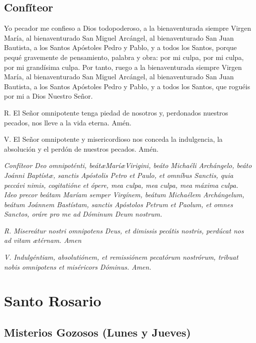 \documentclass[a4paper,11pt, oneside]{report}
\begin{document}
    \section{Confíteor}

      Yo pecador me confieso a Dios todopoderoso, a la bienaventurada siempre Virgen María, al bienaventurado San Miguel Arcángel,
      al bienaventurado San Juan Bautista, a los Santos Apóstoles Pedro y Pablo, y a todos los Santos, porque pequé gravemente de 
      pensamiento, palabra y obra: por mi culpa, por mi culpa, por mi grandísima culpa. Por tanto, ruego a la bienaventurada siempre
      Virgen María, al bienaventurado San Miguel Arcángel, al bienaventurado San Juan Bautista, a los Santos Apóstoles Pedro y Pablo,
      y a todos los Santos, que roguéis por mi a Dios Nuestro Señor.\par\smallskip
      R. El Señor omnipotente tenga piedad de nosotros y, perdonados nuestros pecados, nos lleve a la vida eterna. Amén.\par\smallskip
      V. El Señor omnipotente y misericordioso nos conceda la indulgencia, la absolución y el perdón de nuestros pecados. Amén.

      \medskip

      \textit{Confíteor Deo omnipoténti, beát\ae Marí\ae Virigini, beáto Michaéli Archángelo, beáto Joánni Baptíst\ae, sanctis Apóstolis
      Petro et Paulo, et omníbus Sanctis, quia peccávi nimis, cogitatióne et ópere, mea culpa, mea culpa, mea máxima culpa. Ideo precor
      beátam Maríam semper Virgínem, beátum Michaélem Archángelum, beátum Joánnem Bastístam, sanctis Apóstolos Petrum et Paolum, et omnes
      Sanctos, oráre pro me ad Dóminum Deum nostrum.}\par\smallskip
      \textit{R. Misereátur nostri omnipotens Deus, et dimissis pecátis nostris, perdúcat nos ad vitam {\ae}térnam. Amen}\par\smallskip
      \textit{V. Indulgéntiam, absolutiónem, et remissiónem pecatórum nostrórum, tribuat nobis omnipotens et miséricors Dóminus. Amen.}\cite{frater:oraciones}
      
  \chapter{Santo Rosario}

    \section{Misterios Gozosos (Lunes y Jueves)}
      
\end{document}
